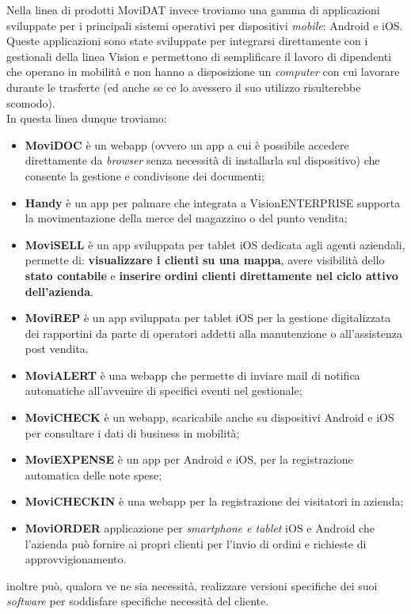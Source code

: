 Nella linea di prodotti MoviDAT invece troviamo una gamma di applicazioni sviluppate per i principali sistemi operativi per dispositivi 
\textit{mobile}: Android e iOS. Queste applicazioni sono state sviluppate per integrarsi direttamente con i gestionali 
della linea Vision e permettono di semplificare il lavoro di dipendenti che operano in mobilità e non hanno a disposizione un 
\textit{computer} con cui lavorare durante le trasferte (ed anche se ce lo avessero il suo utilizzo risulterebbe scomodo).\\
In questa linea dunque troviamo:
\begin{itemize}
    \item \textbf{MoviDOC} è un \gls{webapp} (ovvero un app a cui è possibile accedere direttamente da \textit{browser} senza 
          necessità di installarla sul dispositivo) che consente la gestione e condivisone dei documenti;
    \item \textbf{Handy} è un app per palmare che integrata a VisionENTERPRISE supporta la movimentazione della merce del magazzino o del punto vendita;
    \item \textbf{MoviSELL} è un app sviluppata per tablet iOS dedicata agli agenti aziendali, permette di: \textbf{visualizzare i 
          clienti su una mappa}, avere visibilità dello \textbf{stato contabile} e \textbf{inserire ordini clienti direttamente nel 
          ciclo attivo dell'azienda}.
    \item \textbf{MoviREP} è un app sviluppata per tablet iOS per la gestione digitalizzata dei rapportini da parte di operatori addetti alla manutenzione o 
          all'assistenza post vendita. 
    \item \textbf{MoviALERT} è una \gls{webapp} che permette di inviare mail di notifica automatiche all'avvenire di 
          specifici eventi nel gestionale;
    \item \textbf{MoviCHECK} è un \gls{webapp}, scaricabile anche su dispositivi Android e iOS per 
          consultare i dati di business in mobilità;
    \item \textbf{MoviEXPENSE} è un app per Android e iOS, per la registrazione automatica delle note 
          spese;
    \item \textbf{MoviCHECKIN} è una \gls{webapp} per la registrazione dei visitatori in azienda;
    \item \textbf{MoviORDER} applicazione per \textit{smartphone e tablet} iOS e Android che l’azienda può fornire ai propri clienti per l’invio di ordini e 
          richieste di approvvigionamento.
\end{itemize}
{\company} inoltre può, qualora ve ne sia necessità, realizzare versioni specifiche dei suoi \textit{software} per soddisfare specifiche necessità 
del cliente.

 